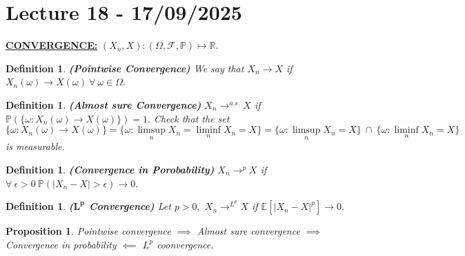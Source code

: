 \documentclass{article}
\newcommand{\1}{\mathds{1}}
\newcommand{\R}{\mathbb{R}}
\newcommand{\E}{\mathbb{E}}
\newcommand{\F}{\mathcal{F}}
\newcommand{\PB}{\mathbb{P}}
\newcommand{\lf}{\left}
\newcommand{\rg}{\right}
\newcommand{\card}[1]{\lf\vert #1\rg\vert}
\newtheorem{proposition}[theorem]{Proposition}
\newtheorem{definition}[theorem]{Definition}
\begin{document}
\section{Lecture 18 - 17/09/2025}
\textbf{\underline{CONVERGENCE:}}
$(X_n,X):(\Omega,\F,\PB)\mapsto \R.$
\begin{definition}\textbf{(Pointwise Convergence)}
    We say that $X_n\to X$ if $X_n(\omega)\to X(\omega)\ \forall\ \omega\in\Omega.$ 
\end{definition}
\begin{definition}\textbf{(Almost sure Convergence)}
    $X_n\to^{a.s.} X$ if $\PB(\{\omega:X_n(\omega)\to X(\omega)\})=1.$ Check that the set $$\{\omega:X_n(\omega)\to X(\omega)\}=\{\omega:\limsup_n X_n=\liminf_n X_n=X\}=\{\omega:\limsup_n X_n=X\}\ \cap\ \{\omega:\liminf_n X_n=X\}$$ is measurable.
\end{definition}
\begin{definition}\textbf{(Convergence in Porobability)}
    $X_n\to^p X$ if  $\forall\ \epsilon>0\ \PB(\card{X_n-X}>\epsilon)\to 0.$
\end{definition}
\begin{definition}\textbf{($\mathbf{L^p}$ Convergence)}
   Let $p>0,$ $X_n\to^{L^p} X$ if $\E[\card{X_n-X}^p]\to 0.$
\end{definition}
\begin{proposition}
    Pointwise convergence $\implies$ Almost sure convergence $\implies$ Convergence in probability $\impliedby$ $L^p$ coonvergence.
\end{proposition}
\end{document}
